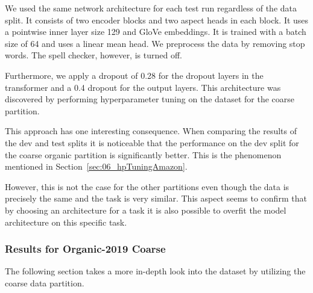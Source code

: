 We used the same network architecture for each test run regardless of the data split. It consists of two encoder blocks and two aspect heads in each block. It uses a pointwise inner layer size 129 and GloVe embeddings. It is trained with a batch size of 64 and uses a linear mean head. We preprocess the data by removing stop words. The spell checker, however, is turned off.

Furthermore, we apply a dropout of 0.28 for the dropout layers in the transformer and a 0.4 dropout for the output layers. This architecture was discovered by performing hyperparameter tuning on the dataset for the coarse partition.
\bigskip

This approach has one interesting consequence. When comparing the results of the dev and test splits it is noticeable that the performance on the dev split for the coarse organic partition is significantly better. This is the phenomenon mentioned in Section~\ref{sec:06_hpTuningAmazon}.
\smallskip

However, this is not the case for the other partitions even though the data is precisely the same and the task is very similar. This aspect seems to confirm that by choosing an architecture for a task it is also possible to overfit the model architecture on this specific task.


\subsubsection*{Results for Organic-2019 Coarse}
The following section takes a more in-depth look into the dataset by utilizing the coarse data partition.

